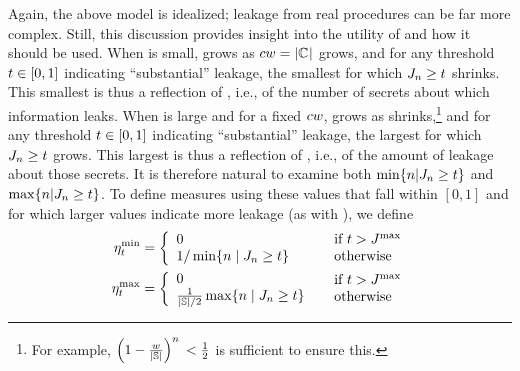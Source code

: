 Again, the above model is idealized; leakage from real procedures can
be far more complex.  Still, this discussion provides insight into the
utility of \Jaccard{\secretsSetSize} and how it should be used.  When
\secretsSetSize is small,  grows as
$cw = \left|{\mathbb{C}_{}}\right|$ grows, and for
any threshold $t \in [0, 1]$ indicating
``substantial'' leakage, the smallest \secretsSetSize for which
$J_{n} \ge t$ shrinks.  This
smallest \secretsSetSize is thus a reflection of
\setSize{\classesUnion}, i.e., of the number of secrets about which
information leaks.  When \secretsSetSize is large and for a fixed
$cw$,  grows as
\classesSize shrinks,\footnote{For example,
  $\left(1-\frac{w}{\left|{\mathbb{S}}\right|}\right)^n{}
  < \frac{1}{2}$ is sufficient to ensure this.} and for any threshold
$t \in [0, 1]$ indicating ``substantial'' leakage, the
largest \secretsSetSize for which $J_{n} \ge
t$ grows.  This largest \secretsSetSize is thus a
reflection of \classesSize, i.e., of the amount of leakage about those
secrets.  It is therefore natural to examine both
$\min\{n | J_{n} \ge
t\}$ and $\max\{n |
J_{n} \ge t\}$.  To define
measures using these values that fall within $[0,1]$ and for which
larger values indicate more leakage (as with
\Jaccard{\secretsSetSize}), we define
\begin{align*}
  \eta^{\textrm{min}}_{t} & =
  \left\{\begin{array}{l}
    0 \\
    1/\min \{n \mid J_{n} \ge t\}
  \end{array}\right.
  &
  \begin{array}{l}
    \mbox{if $t > J^{\textrm{max}}$} \\
    \mbox{otherwise}
  \end{array}
  \\
  \eta^{\textrm{max}}_{t} & =
  \left\{\begin{array}{l}
  0 \\
  \frac{1}{\left|{\mathbb{S}}\right|/2}\max \{n \mid J_{n} \ge t\} 
  \end{array}\right.
  &
  \begin{array}{l}
    \mbox{if $t > J^{\textrm{max}}$} \\
    \mbox{otherwise}
  \end{array}
\end{align*}
